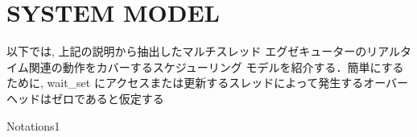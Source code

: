 \section{SYSTEM MODEL}
\label{sec: system_model}


\begin{frame}{}
    以下では, 上記の説明から抽出したマルチスレッド エグゼキューターのリアルタイム関連の動作をカバーするスケジューリング モデルを紹介する．簡単にするために, wait\_set にアクセスまたは更新するスレッドによって発生するオーバーヘッドはゼロであると仮定する
\end{frame}

\begin{frame}{Notations1}
    \begin{table}[tb]
\end{table}
\end{frame}
